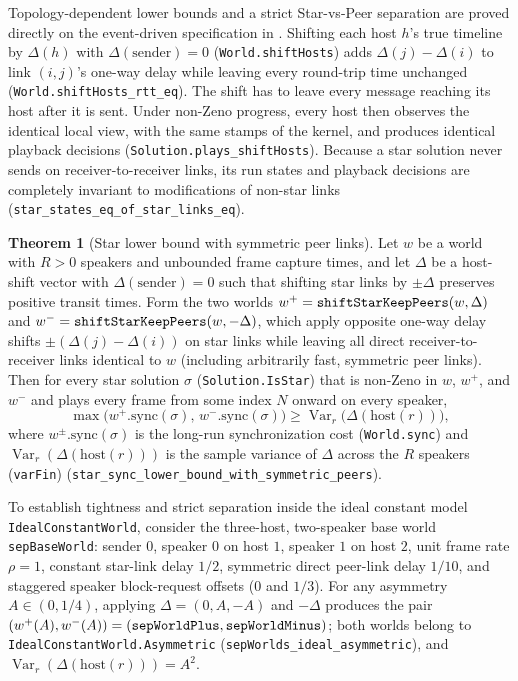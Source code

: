 \documentclass[11pt,a4paper]{article}
\newcommand{\lean}[1]{\texttt{#1}}
\theoremstyle{definition}
\newtheorem{theorem}[definition]{Theorem}
\begin{document}
Topology-dependent lower bounds and a strict Star-vs-Peer separation are
proved directly on the event-driven specification in
. Shifting each host $h$'s true timeline
by $\Delta(h)$ with $\Delta(\mathrm{sender}) = 0$ (\lean{World.shiftHosts})
adds $\Delta(j) - \Delta(i)$ to link $(i, j)$'s one-way delay while leaving
every round-trip time unchanged
(\lean{World.\allowbreak shiftHosts\_\allowbreak rtt\_\allowbreak eq}).
The shift has to leave every message reaching its host after it is sent.
Under non-Zeno progress, every host then observes the identical local view,
with the same stamps of the kernel, and
produces identical playback decisions
(\lean{Solution.\allowbreak plays\_\allowbreak shiftHosts}).
Because a star solution never sends on receiver-to-receiver links, its run
states and playback decisions are completely invariant to modifications of
non-star links
(\lean{star\_\allowbreak states\_\allowbreak eq\_\allowbreak of\_\allowbreak star\_\allowbreak links\_\allowbreak eq}).

\begin{theorem}[Star lower bound with symmetric peer links]
\label{thm:star-lower-bound}
Let $w$ be a world with $R > 0$ speakers and unbounded frame capture times,
and let $\Delta$ be a host-shift vector with $\Delta(\mathrm{sender}) = 0$
such that shifting star links by $\pm\Delta$ preserves positive transit
times. Form the two worlds
$w^+ = \text{\lean{shiftStarKeepPeers}}(w, \Delta)$ and
$w^- = \text{\lean{shiftStarKeepPeers}}(w, -\Delta)$, which apply opposite
one-way delay shifts $\pm(\Delta(j) - \Delta(i))$ on star links while
leaving all direct receiver-to-receiver links identical to $w$ (including
arbitrarily fast, symmetric peer links). Then for every star solution
$\sigma$ (\lean{Solution.IsStar}) that is non-Zeno in $w$, $w^+$, and
$w^-$ and plays every frame from some index $N$ onward on every speaker,
\[
  \max\bigl(w^+.\mathrm{sync}(\sigma),\, w^-.\mathrm{sync}(\sigma)\bigr)
  \ge \operatorname{Var}_r\bigl(\Delta(\mathrm{host}(r))\bigr),
\]
where $w^\pm.\mathrm{sync}(\sigma)$ is the long-run synchronization cost
(\lean{World.sync}) and $\operatorname{Var}_r(\Delta(\mathrm{host}(r)))$ is
the sample variance of $\Delta$ across the $R$ speakers (\lean{varFin})
(\lean{star\_\allowbreak sync\_\allowbreak lower\_\allowbreak bound\_\allowbreak with\_\allowbreak symmetric\_\allowbreak peers}).
\end{theorem}

To establish tightness and strict separation inside the ideal constant model
\lean{IdealConstantWorld}, consider the three-host, two-speaker base world
\lean{sepBaseWorld}: sender $0$, speaker $0$ on host $1$, speaker $1$ on
host $2$, unit frame rate $\rho = 1$, constant star-link delay $1/2$,
symmetric direct peer-link delay $1/10$, and staggered speaker block-request
offsets ($0$ and $1/3$). For any
asymmetry $A \in (0, 1/4)$, applying $\Delta = (0, A, -A)$ and $-\Delta$
produces the pair
$(w^+(A), w^-(A)) = (\text{\lean{sepWorldPlus}}, \text{\lean{sepWorldMinus}})$;
both worlds belong to \lean{IdealConstantWorld.\allowbreak Asymmetric}
(\lean{sepWorlds\_\allowbreak ideal\_\allowbreak asymmetric}), and
$\operatorname{Var}_r(\Delta(\mathrm{host}(r))) = A^2$.
\end{document}
